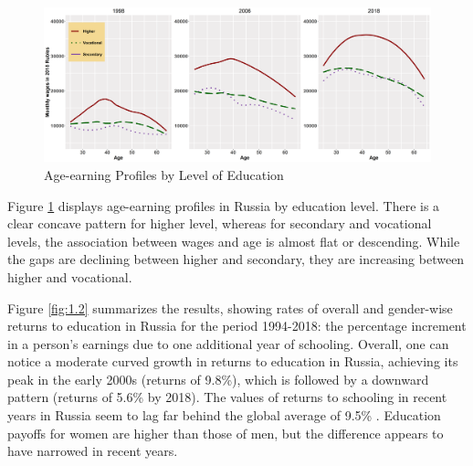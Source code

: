 \documentclass[alpha-refs]{wiley-article-01g}
\begin{document}
\vspace{-0.2in}

\begin{center}
	\begin{figure}[htbp!]
\begin{minipage}[b]{1\linewidth}
			\centering
			\hspace*{-0.3in}
			\includegraphics[width=6in]{earnings_by_level.png}
		\end{minipage}
			\caption{Age-earning Profiles by Level of Education}\label{fig:5.2}
	\end{figure}
\end{center}

\vspace{-0.2in}

Figure \ref{fig:5.2} displays age-earning profiles in Russia by education level. There is a clear concave pattern for higher level, whereas for secondary and vocational levels, the association between wages and age is almost flat or descending. While the gaps are declining between higher and secondary, they are increasing between higher and vocational. 

Figure \ref{fig:1.2} summarizes the results, showing rates of overall and gender-wise returns to education in Russia for the period 1994-2018: the percentage increment in a person's earnings due to one additional year of schooling. Overall, one can notice a moderate curved growth in returns to education in Russia, achieving its peak in the early 2000s (returns of 9.8\%), which is followed by a downward pattern (returns of 5.6\% by 2018). The values of returns to schooling in recent years in Russia seem to lag far behind the global average of 9.5\% \parencite{Psacharopoulos_Patrinos2018}. Education payoffs for women are higher than those of men, but the difference appears to have narrowed in recent years.
\end{document}
